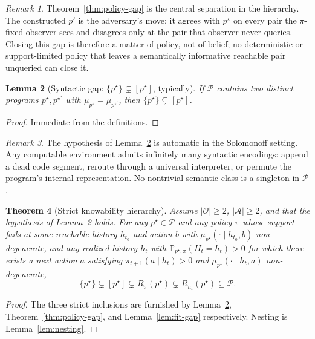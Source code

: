 \documentclass[11pt]{article}
\newtheorem{theorem}{Theorem}[section]
\newtheorem{lemma}[theorem]{Lemma}
\theoremstyle{definition}
\theoremstyle{remark}
\newtheorem{remark}[theorem]{Remark}
\newcommand{\Acal}{\mathcal{A}}
\newcommand{\Ocal}{\mathcal{O}}
\newcommand{\Pcal}{\mathcal{P}}
\newcommand{\Prob}{\mathbb{P}}
\begin{document}
\begin{remark}
Theorem~\ref{thm:policy-gap} is the central separation in the hierarchy. The constructed $p'$ is the adversary's move: it agrees with $p^\star$ on every pair the $\pi$-fixed observer sees and disagrees only at the pair that observer never queries. Closing this gap is therefore a matter of policy, not of belief; no deterministic or support-limited policy that leaves a semantically informative reachable pair unqueried can close it.
\end{remark}

\begin{lemma}[{Syntactic gap: $\{p^\star\}\subsetneq [p^\star]$, typically}]
\label{lem:syntactic-gap}
If $\Pcal$ contains two distinct programs $p^\star, p^{\star\prime}$ with $\mu_{p^\star}=\mu_{p^{\star\prime}}$, then $\{p^\star\}\subsetneq [p^\star]$.
\end{lemma}

\begin{proof}
Immediate from the definitions.
\end{proof}

\begin{remark}
The hypothesis of Lemma~\ref{lem:syntactic-gap} is automatic in the Solomonoff setting. Any computable environment admits infinitely many syntactic encodings: append a dead code segment, reroute through a universal interpreter, or permute the program's internal representation. No nontrivial semantic class is a singleton in $\Pcal$.
\end{remark}

\begin{theorem}[Strict knowability hierarchy]
\label{thm:strict-hierarchy}
Assume $|\Ocal|\ge 2$, $|\Acal|\ge 2$, and that the hypothesis of Lemma~\ref{lem:syntactic-gap} holds. For any $p^\star\in\Pcal$ and any policy $\pi$ whose support fails at some reachable history $h_{t_0}$ and action $b$ with $\mu_{p^\star}(\cdot\mid h_{t_0},b)$ non-degenerate, and any realized history $h_t$ with $\Prob_{p^\star,\pi}(H_t=h_t)>0$ for which there exists a next action $a$ satisfying $\pi_{t+1}(a\mid h_t)>0$ and $\mu_{p^\star}(\cdot\mid h_t,a)$ non-degenerate,
\[
\{p^\star\}\subsetneq [p^\star]\subsetneq R_\pi(p^\star)\subsetneq R_{h_t}(p^\star)\subseteq \Pcal.
\]
\end{theorem}

\begin{proof}
The three strict inclusions are furnished by Lemma~\ref{lem:syntactic-gap}, Theorem~\ref{thm:policy-gap}, and Lemma~\ref{lem:fit-gap} respectively. Nesting is Lemma~\ref{lem:nesting}.
\end{proof}
\end{document}
